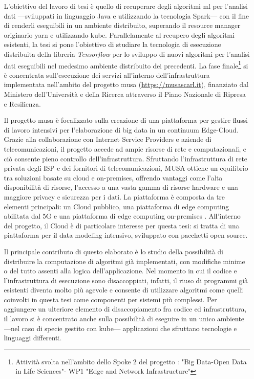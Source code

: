 \documentclass[12pt,a4paper,fleqn,titlepage]{report}
\begin{document}
    L'obiettivo del lavoro di tesi è quello di recuperare degli algoritmi \gls{ml} per l'analisi dati —sviluppati in linguaggio Java e utilizzando la tecnologia Spark— con il fine di renderli eseguibili in un ambiente distribuito, superando il resource manager originario \gls{yarn} e utilizzando \gls{kube}. Parallelamente al recupero degli algoritmi esistenti, la tesi si pone l'obiettivo di studiare la tecnologia di esecuzione distribuita della libreria \emph{Tensorflow} per lo sviluppo di nuovi algoritmi per l'analisi dati eseguibili nel medesimo ambiente distribuito dei precedenti. La fase finale\footnote{Attività svolta nell'ambito dello Spoke 2 del progetto : "Big Data-Open Data in Life Sciences"- WP1 "Edge and Network Infrastructure"} si è concentrata sull'esecuzione dei servizi all'interno dell'infrastruttura implementata nell'ambito del progetto \gls{musa} (\url{https://musascarl.it}), finanziato dal Ministero dell’Università e della Ricerca attraverso il Piano Nazionale di Ripresa e Resilienza.

    Il progetto \gls{musa} è focalizzato sulla creazione di una piattaforma per gestire flussi di lavoro intensivi per l'elaborazione di \gls{big data} in un continuum Edge-Cloud. Grazie alla collaborazione con Internet Service Providers e aziende di telecomunicazioni, il progetto accede ad ampie risorse di rete e computazionali, e ciò consente pieno controllo dell'infrastruttura. Sfruttando l'infrastruttura di rete privata degli ISP e dei fornitori di telecomunicazioni, MUSA ottiene un equilibrio tra soluzioni basate su cloud e on-premises, offrendo vantaggi come l'alta disponibilità di risorse, l'accesso a una vasta gamma di risorse hardware e una maggiore privacy e sicurezza per i dati. La piattaforma è composta da tre elementi principali: un Cloud pubblico, una piattaforma di edge computing abilitata dal 5G e una piattaforma di edge computing on-premises \cite{anisetti:2024}. All'interno del progetto, il Cloud è di particolare interesse per questa tesi: si tratta di una piattaforma per il data modeling intensivo, sviluppato con pacchetti open source.

    Il principale contributo di questo elaborato è lo studio della possibilità di distribuire la computazione di algoritmi già implementati, con modifiche minime o del tutto assenti alla logica dell'applicazione. Nel momento in cui il codice e l'infrastruttura di esecuzione sono disaccoppiati, infatti, il riuso di programmi già esistenti diventa molto più agevole e consente di utilizzare algoritmi come quelli coinvolti in questa tesi come componenti per sistemi più complessi. Per aggiungere un ulteriore elemento di disaccopiamento fra codice ed infrastruttura, il lavoro si è concentrato anche sulla possibilità di eseguire in un unico ambiente —nel caso di specie gestito con \gls{kube}— applicazioni che sfruttano tecnologie e linguaggi differenti.
\end{document}
